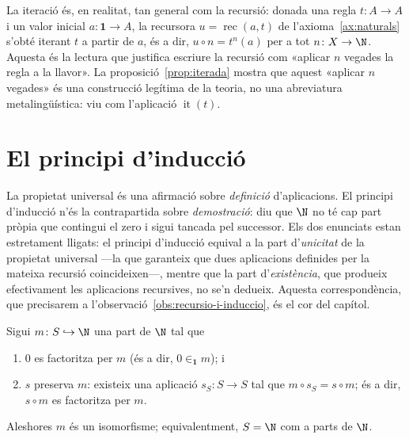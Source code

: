 \begin{observacio}\label{obs:recursio-iteracio}
La iteració és, en realitat, tan general com la recursió: donada una regla
\(t\colon A\to A\) i un valor inicial \(a\colon\mathbf1\to A\), la
recursora \(u=\operatorname{rec}(a,t)\) de l'axioma~\ref{ax:naturals}
s'obté iterant \(t\) a partir de \(a\), és a dir,
\(u\circ n=t^{n}(a)\) per a tot \(n\colon X\to\N\). Aquesta és la lectura
que justifica escriure la recursió com «aplicar \(n\) vegades la regla a
la llavor». La proposició~\ref{prop:iterada} mostra que aquest «aplicar
\(n\) vegades» és una construcció legítima de la teoria, no una
abreviatura metalingüística: viu com l'aplicació \(\operatorname{it}(t)\).
\end{observacio}

\section{El principi d'inducció}\label{sec:induccio}

La propietat universal és una afirmació sobre \emph{definició} d'aplicacions.
El principi d'inducció n'és la contrapartida sobre \emph{demostració}:
diu que \(\N\) no té cap part pròpia que contingui el zero i sigui tancada
pel successor. Els dos enunciats estan estretament lligats: el principi
d'inducció equival a la part d'\emph{unicitat} de la propietat universal
---la que garanteix que dues aplicacions definides per la mateixa recursió
coincideixen---, mentre que la part d'\emph{existència}, que produeix
efectivament les aplicacions recursives, no se'n dedueix. Aquesta
correspondència, que precisarem a
l'observació~\ref{obs:recursio-i-induccio}, és el cor del capítol.

\begin{teorema}\label{teo:induccio}
Sigui \(m\colon S\hookrightarrow\N\) una part de \(\N\) tal que
\begin{enumerate}
\item \(0\) es factoritza per \(m\) (és a dir, \(0\in_{\mathbf1}m\)); i
\item \(s\) preserva \(m\): existeix una aplicació \(s_S\colon S\to S\)
tal que \(m\circ s_S=s\circ m\); és a dir, \(s\circ m\) es factoritza per
\(m\).
\end{enumerate}
Aleshores \(m\) és un isomorfisme; equivalentment, \(S=\N\) com a parts de
\(\N\).
\end{teorema}

